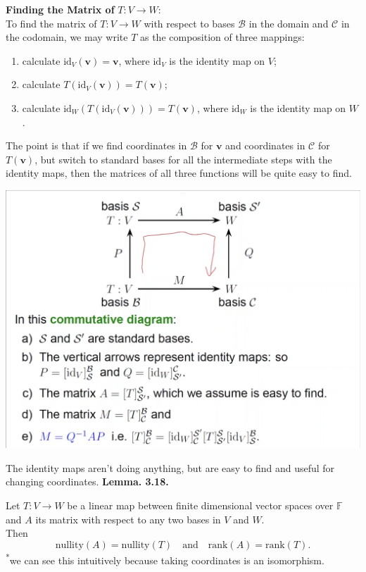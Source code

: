\documentclass{article}
\newcommand{\vect}[1]{\mathbf{#1}}
\newcommand{\lemma}[2]{\textbf{Lemma. #1.}\begin{adjustwidth}{1cm}{1cm}#2\end{adjustwidth}}
\begin{document}
\textbf{Finding the Matrix of} $T: V \rightarrow W$:\\
To find the matrix of $T: V \rightarrow W$ with respect to bases $\mathcal{B}$ in the domain and $\mathcal{C}$ in the codomain, we may write $T$ as the composition of three mappings:
\begin{enumerate}
  \item calculate $\text{id}_V(\vect{v}) = \vect{v}$, where $\text{id}_V$ is the identity map on $V$;
  \item calculate $T(\text{id}_V(\vect{v})) = T(\vect{v})$;
  \item calculate $\text{id}_W(T(\text{id}_V(\vect{v}))) = T(\vect{v})$, where $\text{id}_W$ is the identity map on $W$.
\end{enumerate}
The point is that if we find coordinates in $\mathcal{B}$ for $\vect{v}$ and coordinates in $\mathcal{C}$ for $T(\vect{v})$, but switch to standard bases for all the intermediate steps with the identity maps, then the matrices of all three functions will be quite easy to find.
\begin{center}
  \includegraphics[scale=0.3]{assets/identity_map.png}
\end{center}
The identity maps aren't doing anything, but are easy to find and useful for changing coordinates.\newpage
\lemma{3.18}{Let $T: V \rightarrow W$ be a linear map between finite dimensional vector spaces over $\mathbb{F}$ and $A$ its matrix with respect to any two bases in $V$ and $W$.\\Then \[\text{nullity}(A) = \text{nullity}(T) \quad \text{and} \quad \text{rank}(A) = \text{rank}(T).\]\textsuperscript{*}we can see this intuitively because taking coordinates is an isomorphism.}~\\
\end{document}
